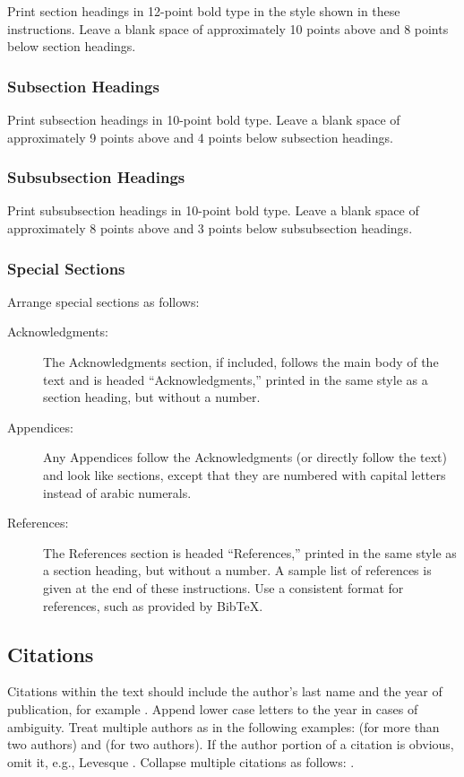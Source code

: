 Print section headings in 12-point bold type in the style shown in these
instructions.  Leave a blank space of approximately 10 points above and 8
points below section headings.

\subsubsection{Subsection Headings}

Print subsection headings in 10-point bold type.  Leave a blank space of
approximately 9 points above and 4 points below subsection headings.

\subsubsection{Subsubsection Headings}

Print subsubsection headings in 10-point bold type.  Leave a blank space of
approximately 8 points above and 3 points below subsubsection headings.

\subsubsection{Special Sections}

Arrange special sections as follows:
\begin{description}
\item[Acknowledgments:] 
The Acknowledgments section, if included, follows the main body of the text
and is headed ``Acknowledgments,'' printed in the same style as a section
heading, but without a number. 
\item[Appendices:] 
Any Appendices follow the Acknowledgments (or directly follow the text) and
look like sections, except that they are numbered with capital letters
instead of arabic numerals. 
\item[References:]
The References section is headed ``References,'' printed in the same
style as a section heading, but without a number.
A sample list of references is given at the end of these
instructions.
Use a consistent format for references, such as provided by
Bib\TeX{}.
\end{description}

\subsection{Citations}

Citations within the text should include the author's last name and
the year of publication, for example \cite{cheeseman:probability}.
Append lower case letters to the year in cases of ambiguity.
Treat multiple authors as in the following examples:
\cite{abelson-et-al:scheme} (for more than two authors) and
\cite{brachman-schmolze:kl-one} (for two authors).
If the author portion of a citation is obvious, omit it,
e.g., Levesque .
Collapse multiple citations as follows:
\cite{levesque:functional-foundations,haugeland:mind-design}.%
\nocite{abelson-et-al:scheme}%
\nocite{brachman-schmolze:kl-one}%
\nocite{cheeseman:probability}%
\nocite{haugeland:mind-design}%
\nocite{lenat:heuristics}%
\nocite{levesque:functional-foundations}%
\nocite{levesque:belief}

